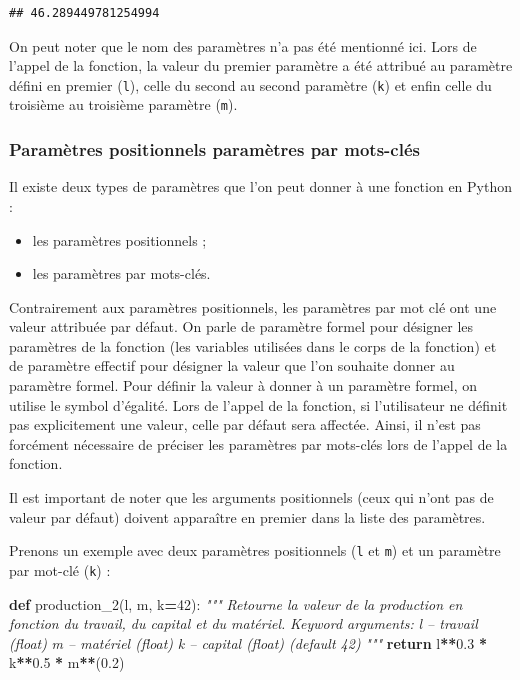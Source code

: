 \documentclass[12pt,]{book}
\newenvironment{Shaded}{\begin{snugshade}}{\end{snugshade}}
\newcommand{\KeywordTok}[1]{\textcolor[rgb]{0.13,0.29,0.53}{\textbf{#1}}}
\newcommand{\DecValTok}[1]{\textcolor[rgb]{0.00,0.00,0.81}{#1}}
\newcommand{\FloatTok}[1]{\textcolor[rgb]{0.00,0.00,0.81}{#1}}
\newcommand{\CommentTok}[1]{\textcolor[rgb]{0.56,0.35,0.01}{\textit{#1}}}
\newcommand{\ControlFlowTok}[1]{\textcolor[rgb]{0.13,0.29,0.53}{\textbf{#1}}}
\newcommand{\OperatorTok}[1]{\textcolor[rgb]{0.81,0.36,0.00}{\textbf{#1}}}
\newcommand{\NormalTok}[1]{#1}
\providecommand{\tightlist}{%
  \setlength{\itemsep}{0pt}\setlength{\parskip}{0pt}}
\numberwithin{equation}{section}
\numberwithin{countremarque}{section}
\begin{document}
\begin{lstlisting}
## 46.289449781254994
\end{lstlisting}

On peut noter que le nom des paramètres n'a pas été mentionné ici. Lors
de l'appel de la fonction, la valeur du premier paramètre a été attribué
au paramètre défini en premier (\texttt{l}), celle du second au second
paramètre (\texttt{k}) et enfin celle du troisième au troisième
paramètre (\texttt{m}).

\subsubsection{Paramètres positionnels paramètres par
mots-clés}\label{parametres-positionnels-parametres-par-mots-cles}

Il existe deux types de paramètres que l'on peut donner à une fonction
en Python :

\begin{itemize}
\tightlist
\item
  les paramètres positionnels ;
\item
  les paramètres par mots-clés.
\end{itemize}

Contrairement aux paramètres positionnels, les paramètres par mot clé
ont une valeur attribuée par défaut. On parle de paramètre formel pour
désigner les paramètres de la fonction (les variables utilisées dans le
corps de la fonction) et de paramètre effectif pour désigner la valeur
que l'on souhaite donner au paramètre formel. Pour définir la valeur à
donner à un paramètre formel, on utilise le symbol d'égalité. Lors de
l'appel de la fonction, si l'utilisateur ne définit pas explicitement
une valeur, celle par défaut sera affectée. Ainsi, il n'est pas
forcément nécessaire de préciser les paramètres par mots-clés lors de
l'appel de la fonction.

Il est important de noter que les arguments positionnels (ceux qui n'ont
pas de valeur par défaut) doivent apparaître en premier dans la liste
des paramètres.

Prenons un exemple avec deux paramètres positionnels (\texttt{l} et
\texttt{m}) et un paramètre par mot-clé (\texttt{k}) :

\begin{Shaded}
\begin{Highlighting}[]
\KeywordTok{def}\NormalTok{ production_2(l, m, k}\OperatorTok{=}\DecValTok{42}\NormalTok{):}
  \CommentTok{"""}
\CommentTok{  Retourne la valeur de la production en fonction}
\CommentTok{  du travail, du capital et du matériel.}
\CommentTok{  }
\CommentTok{  Keyword arguments:}
\CommentTok{  l -- travail (float)}
\CommentTok{  m -- matériel (float)}
\CommentTok{  k -- capital (float) (default 42)}
\CommentTok{  """}
  \ControlFlowTok{return}\NormalTok{ l}\OperatorTok{**}\FloatTok{0.3} \OperatorTok{*}\NormalTok{ k}\OperatorTok{**}\FloatTok{0.5} \OperatorTok{*}\NormalTok{ m}\OperatorTok{**}\NormalTok{(}\FloatTok{0.2}\NormalTok{)}
\end{Highlighting}
\end{Shaded}
\end{document}
